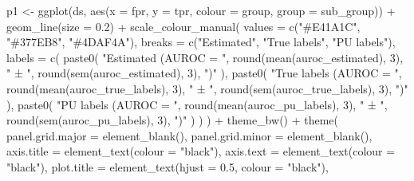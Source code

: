 \documentclass[
  11pt,
  oneside]{book}
\newenvironment{Shaded}{\begin{snugshade}}{\end{snugshade}}
\newcommand{\AttributeTok}[1]{\textcolor[rgb]{0.77,0.63,0.00}{#1}}
\newcommand{\DecValTok}[1]{\textcolor[rgb]{0.00,0.00,0.81}{#1}}
\newcommand{\FloatTok}[1]{\textcolor[rgb]{0.00,0.00,0.81}{#1}}
\newcommand{\FunctionTok}[1]{\textcolor[rgb]{0.00,0.00,0.00}{#1}}
\newcommand{\NormalTok}[1]{#1}
\newcommand{\OtherTok}[1]{\textcolor[rgb]{0.56,0.35,0.01}{#1}}
\newcommand{\SpecialCharTok}[1]{\textcolor[rgb]{0.00,0.00,0.00}{#1}}
\newcommand{\StringTok}[1]{\textcolor[rgb]{0.31,0.60,0.02}{#1}}
\begin{document}
\begin{Shaded}
\begin{Highlighting}[]
\NormalTok{p1 }\OtherTok{\textless{}{-}} \FunctionTok{ggplot}\NormalTok{(ds, }\FunctionTok{aes}\NormalTok{(}\AttributeTok{x =}\NormalTok{ fpr, }\AttributeTok{y =}\NormalTok{ tpr, }\AttributeTok{colour =}\NormalTok{ group, }\AttributeTok{group =}\NormalTok{ sub\_group)) }\SpecialCharTok{+}
  \FunctionTok{geom\_line}\NormalTok{(}\AttributeTok{size =} \FloatTok{0.2}\NormalTok{) }\SpecialCharTok{+}
  \FunctionTok{scale\_colour\_manual}\NormalTok{(}
    \AttributeTok{values =} \FunctionTok{c}\NormalTok{(}\StringTok{"\#E41A1C"}\NormalTok{, }\StringTok{"\#377EB8"}\NormalTok{, }\StringTok{"\#4DAF4A"}\NormalTok{),}
    \AttributeTok{breaks =} \FunctionTok{c}\NormalTok{(}\StringTok{"Estimated"}\NormalTok{, }\StringTok{"True labels"}\NormalTok{, }\StringTok{"PU labels"}\NormalTok{),}
    \AttributeTok{labels =} \FunctionTok{c}\NormalTok{(}
      \FunctionTok{paste0}\NormalTok{(}
        \StringTok{"Estimated (AUROC = "}\NormalTok{, }\FunctionTok{round}\NormalTok{(}\FunctionTok{mean}\NormalTok{(auroc\_estimated), }\DecValTok{3}\NormalTok{), }\StringTok{" ± "}\NormalTok{,}
        \FunctionTok{round}\NormalTok{(}\FunctionTok{sem}\NormalTok{(auroc\_estimated), }\DecValTok{3}\NormalTok{), }\StringTok{")"}
\NormalTok{      ),}
      \FunctionTok{paste0}\NormalTok{(}
        \StringTok{"True labels (AUROC = "}\NormalTok{, }\FunctionTok{round}\NormalTok{(}\FunctionTok{mean}\NormalTok{(auroc\_true\_labels), }\DecValTok{3}\NormalTok{), }\StringTok{" ± "}\NormalTok{,}
        \FunctionTok{round}\NormalTok{(}\FunctionTok{sem}\NormalTok{(auroc\_true\_labels), }\DecValTok{3}\NormalTok{), }\StringTok{")"}
\NormalTok{      ),}
      \FunctionTok{paste0}\NormalTok{(}
        \StringTok{"PU labels (AUROC = "}\NormalTok{, }\FunctionTok{round}\NormalTok{(}\FunctionTok{mean}\NormalTok{(auroc\_pu\_labels), }\DecValTok{3}\NormalTok{), }\StringTok{" ± "}\NormalTok{,}
        \FunctionTok{round}\NormalTok{(}\FunctionTok{sem}\NormalTok{(auroc\_pu\_labels), }\DecValTok{3}\NormalTok{), }\StringTok{")"}
\NormalTok{      )}
\NormalTok{    )}
\NormalTok{  ) }\SpecialCharTok{+}
  \FunctionTok{theme\_bw}\NormalTok{() }\SpecialCharTok{+}
  \FunctionTok{theme}\NormalTok{(}
    \AttributeTok{panel.grid.major =} \FunctionTok{element\_blank}\NormalTok{(),}
    \AttributeTok{panel.grid.minor =} \FunctionTok{element\_blank}\NormalTok{(),}
    \AttributeTok{axis.title =} \FunctionTok{element\_text}\NormalTok{(}\AttributeTok{colour =} \StringTok{"black"}\NormalTok{),}
    \AttributeTok{axis.text =} \FunctionTok{element\_text}\NormalTok{(}\AttributeTok{colour =} \StringTok{"black"}\NormalTok{),}
    \AttributeTok{plot.title =} \FunctionTok{element\_text}\NormalTok{(}\AttributeTok{hjust =} \FloatTok{0.5}\NormalTok{, }\AttributeTok{colour =} \StringTok{"black"}\NormalTok{),}

\end{Highlighting}
\end{Shaded}
\end{document}
